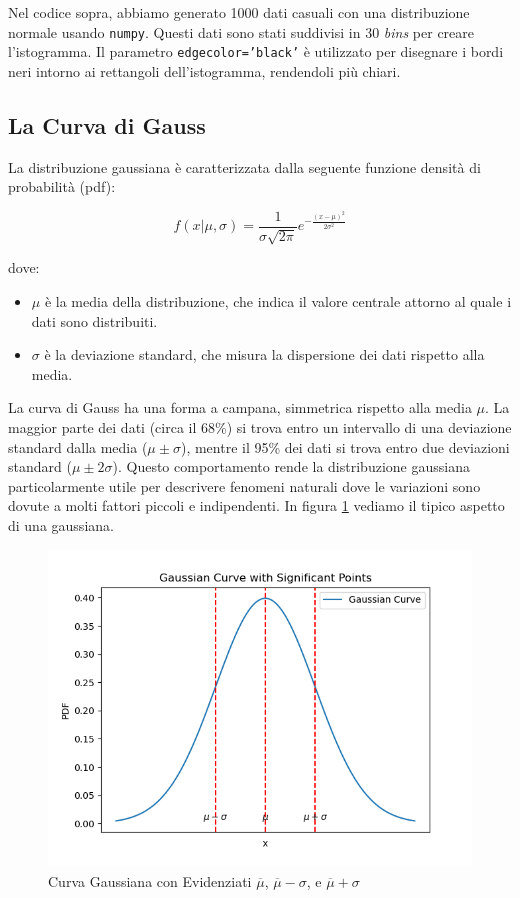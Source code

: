 Nel codice sopra, abbiamo generato 1000 dati casuali con una distribuzione normale usando \texttt{numpy}. Questi dati sono stati suddivisi in 30 \textit{bins} per creare l'istogramma. Il parametro \texttt{edgecolor='black'} è utilizzato per disegnare i bordi neri intorno ai rettangoli dell'istogramma, rendendoli più chiari.






\subsection{La Curva di Gauss}

La distribuzione gaussiana è caratterizzata dalla seguente funzione densità di probabilità (pdf):

\begin{equation}
f(x|\mu,\sigma) = \frac{1}{\sigma \sqrt{2\pi}} e^{-\frac{(x-\mu)^2}{2\sigma^2}}
\end{equation}

dove:
\begin{itemize}
    \item $\mu$ è la media della distribuzione, che indica il valore centrale attorno al quale i dati sono distribuiti.
    \item $\sigma$ è la deviazione standard, che misura la dispersione dei dati rispetto alla media.
\end{itemize}

La curva di Gauss ha una forma a campana, simmetrica rispetto alla media $\mu$. La maggior parte dei dati (circa il 68\%) si trova entro un intervallo di una deviazione standard dalla media ($\mu \pm \sigma$), mentre il 95\% dei dati si trova entro due deviazioni standard ($\mu \pm 2\sigma$). Questo comportamento rende la distribuzione gaussiana particolarmente utile per descrivere fenomeni naturali dove le variazioni sono dovute a molti fattori piccoli e indipendenti. In figura \ref{fig:curva_gaussiana} vediamo il tipico aspetto di una gaussiana.

\begin{figure}[h!]
    \centering
     \includegraphics[scale=0.7]{curva_gaussiana.png} 
    \caption{Curva Gaussiana con Evidenziati \(\overline{\mu}\), \(\overline{\mu} - \sigma\), e \(\overline{\mu} + \sigma\)}
    \label{fig:curva_gaussiana}
\end{figure}


